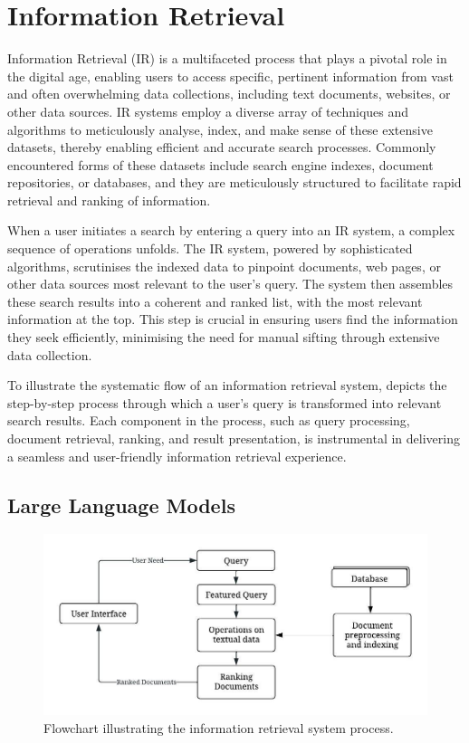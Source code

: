 \section{Information Retrieval}
Information Retrieval (IR) is a multifaceted process that plays a pivotal role in the digital age, enabling users to access specific, pertinent information from vast and often overwhelming data collections, including text documents, websites, or other data sources. IR systems employ a diverse array of techniques and algorithms to meticulously analyse, index, and make sense of these extensive datasets, thereby enabling efficient and accurate search processes. Commonly encountered forms of these datasets include search engine indexes, document repositories, or databases, and they are meticulously structured to facilitate rapid retrieval and ranking of information.

When a user initiates a search by entering a query into an IR system, a complex sequence of operations unfolds. The IR system, powered by sophisticated algorithms, scrutinises the indexed data to pinpoint documents, web pages, or other data sources most relevant to the user's query. The system then assembles these search results into a coherent and ranked list, with the most relevant information at the top. This step is crucial in ensuring users find the information they seek efficiently, minimising the need for manual sifting through extensive data collection.

To illustrate the systematic flow of an information retrieval system,  depicts the step-by-step process through which a user's query is transformed into relevant search results. Each component in the process, such as query processing, document retrieval, ranking, and result presentation, is instrumental in delivering a seamless and user-friendly information retrieval experience.

\subsection{Large Language Models}
\begin{figure}
    \centering
    \includegraphics[width=\textwidth]{2Background/Background/IR.jpeg}
    \caption{Flowchart illustrating the information retrieval system process.}
    \label{fig:pipelines}
\end{figure}

